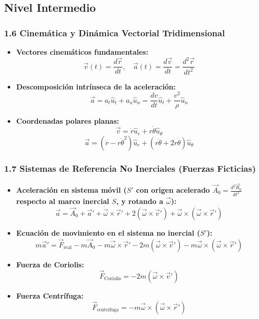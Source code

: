 \documentclass[11pt,a4paper]{article}
\begin{document}
\subsection*{Nivel Intermedio}

\subsubsection*{1.6 Cinemática y Dinámica Vectorial Tridimensional}

\begin{itemize}
  \item \textbf{Vectores cinemáticos fundamentales:}
  \[
    \vec{v}(t) = \frac{d\vec{r}}{dt}, \quad \vec{a}(t) = \frac{d\vec{v}}{dt} = \frac{d^2\vec{r}}{dt^2}
  \]
  \item \textbf{Descomposición intrínseca de la aceleración:}
  \[
    \vec{a} = a_t \hat{u}_t + a_n \hat{u}_n = \frac{dv}{dt} \hat{u}_t + \frac{v^2}{\rho} \hat{u}_n
  \]
  \item \textbf{Coordenadas polares planas:}
  \[
    \vec{v} = \dot{r} \hat{u}_r + r \dot{\theta} \hat{u}_\theta
  \]
  \[
    \vec{a} = (\ddot{r} - r\dot{\theta}^2)\hat{u}_r + (r\ddot{\theta} + 2\dot{r}\dot{\theta})\hat{u}_\theta
  \]
\end{itemize}

\subsubsection*{1.7 Sistemas de Referencia No Inerciales (Fuerzas Ficticias)}

\begin{itemize}
  \item \textbf{Aceleración en sistema móvil ($S'$ con origen acelerado $\vec{A}_0 = \frac{d^2\vec{R}_0}{dt^2}$ respecto al marco inercial $S$, y rotando a $\vec{\omega}$):}
  \[
    \vec{a} = \vec{A}_0 + \vec{a}' + \dot{\vec{\omega}} \times \vec{r}' + 2(\vec{\omega} \times \vec{v}') + \vec{\omega} \times (\vec{\omega} \times \vec{r}')
  \]
  \item \textbf{Ecuación de movimiento en el sistema no inercial ($S'$):}
  \[
    m\vec{a}' = \vec{F}_{\text{real}} - m\vec{A}_0 - m\dot{\vec{\omega}} \times \vec{r}' - 2m(\vec{\omega} \times \vec{v}') - m\vec{\omega} \times (\vec{\omega} \times \vec{r}')
  \]
  \item \textbf{Fuerza de Coriolis:}
  \[
    \vec{F}_{\text{Coriolis}} = -2m (\vec{\omega} \times \vec{v}')
  \]
  \item \textbf{Fuerza Centrífuga:}
  \[
    \vec{F}_{\text{centrífuga}} = -m\vec{\omega} \times (\vec{\omega} \times \vec{r}')
  \]
\end{itemize}
\end{document}

